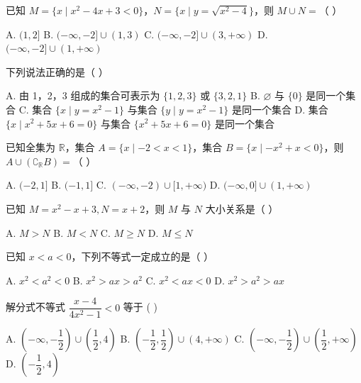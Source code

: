 \documentclass[11pt, a4paper]{article}
\begin{document}
\begin{baitap}[5]
已知 $M = \{x \mid x^2 - 4x + 3 < 0\}$，$N = \{x \mid y = \sqrt{x^2 - 4}\}$，则 $M \cup N =$（ ）
\par\vspace{3pt}
\noindent A. $(1, 2]$ \quad B. $(-\infty, -2] \cup (1, 3)$ \quad C. $(-\infty, -2] \cup (3, +\infty)$ \quad D. $(-\infty, -2] \cup (1, +\infty)$
\end{baitap}

\begin{baitap}[6]
下列说法正确的是（ ）
\par\vspace{3pt}
\noindent A. 由 1，2，3 组成的集合可表示为 $\{1,2,3\}$ 或 $\{3,2,1\}$ \quad B. $\varnothing$ 与 $\{0\}$ 是同一个集合 \quad C. 集合 $\{x\mid y=x^2-1\}$ 与集合 $\{y\mid y=x^2-1\}$ 是同一个集合 \quad D. 集合 $\{x\mid x^2+5x+6=0\}$ 与集合 $\{x^2+5x+6=0\}$ 是同一个集合
\end{baitap}

\begin{baitap}[7]
已知全集为 $\mathbb{R}$，集合 $A=\{x\mid -2<x<1\}$，集合 $B=\{x\mid -x^2+x<0\}$，则 $A\cup(\complement_{\mathbb{R}}B)=$（ ）
\par\vspace{3pt}
\noindent A. $(-2,1]$ \quad B. $(-1,1]$ \quad C. $(-\infty,-2)\cup[1,+\infty)$ \quad D. $(-\infty,0]\cup(1,+\infty)$
\end{baitap}

\begin{baitap}[8]
已知 $M = x^2 - x + 3, N = x + 2$，则 $M$ 与 $N$ 大小关系是（ ）
\par\vspace{3pt}
\noindent A. $M > N$ \quad B. $M < N$ \quad C. $M \ge N$ \quad D. $M \le N$
\end{baitap}

\begin{baitap}[9]
已知 $x<a<0$，下列不等式一定成立的是（ ）
\par\vspace{3pt}
\noindent A. $x^2<a^2<0$ \quad B. $x^2>ax>a^2$ \quad C. $x^2<ax<0$ \quad D. $x^2>a^2>ax$
\end{baitap}

\begin{baitap}[10]
解分式不等式 $\dfrac{x-4}{4x^2-1} < 0$ 等于 ( )
\par\vspace{3pt}
\noindent A. $(-\infty, -\dfrac{1}{2}) \cup (\dfrac{1}{2}, 4)$ \quad B. $(-\dfrac{1}{2}, \dfrac{1}{2}) \cup (4, +\infty)$ \quad C. $(-\infty, -\dfrac{1}{2}) \cup (\dfrac{1}{2}, +\infty)$ \quad D. $(-\dfrac{1}{2}, 4)$
\end{baitap}
\end{document}

